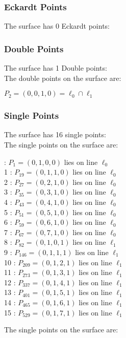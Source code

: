 \documentclass{article}
\begin{document}
{\subsubsection*{Eckardt Points}
The surface has 0 Eckardt points:\\
\subsubsection*{Double Points}
The surface has 1 Double points:\\
The double points on the surface are:\\
\begin{multicols}{2}
\noindent
$P_{2} = ( 0, 0, 1, 0 ) = \ell_{0} \cap \ell_{1} $\\
\end{multicols}
\subsubsection*{Single Points}
The surface has 16 single points:\\
The single points on the surface are:\\
\begin{multicols}{2}
 : $P_{1}=( 0, 1, 0, 0 )$ lies on line $\ell_{0}$\\
1 : $P_{19}=( 0, 1, 1, 0 )$ lies on line $\ell_{0}$\\
2 : $P_{27}=( 0, 2, 1, 0 )$ lies on line $\ell_{0}$\\
3 : $P_{35}=( 0, 3, 1, 0 )$ lies on line $\ell_{0}$\\
4 : $P_{43}=( 0, 4, 1, 0 )$ lies on line $\ell_{0}$\\
5 : $P_{51}=( 0, 5, 1, 0 )$ lies on line $\ell_{0}$\\
6 : $P_{59}=( 0, 6, 1, 0 )$ lies on line $\ell_{0}$\\
7 : $P_{67}=( 0, 7, 1, 0 )$ lies on line $\ell_{0}$\\
8 : $P_{82}=( 0, 1, 0, 1 )$ lies on line $\ell_{1}$\\
9 : $P_{146}=( 0, 1, 1, 1 )$ lies on line $\ell_{1}$\\
10 : $P_{209}=( 0, 1, 2, 1 )$ lies on line $\ell_{1}$\\
11 : $P_{273}=( 0, 1, 3, 1 )$ lies on line $\ell_{1}$\\
12 : $P_{337}=( 0, 1, 4, 1 )$ lies on line $\ell_{1}$\\
13 : $P_{401}=( 0, 1, 5, 1 )$ lies on line $\ell_{1}$\\
14 : $P_{465}=( 0, 1, 6, 1 )$ lies on line $\ell_{1}$\\
15 : $P_{529}=( 0, 1, 7, 1 )$ lies on line $\ell_{1}$\\
\end{multicols}
The single points on the surface are:\\
}
\end{document}
